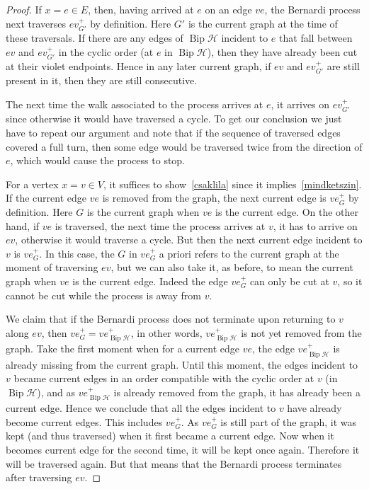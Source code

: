 \documentclass[10pt]{amsart}
\theoremstyle{definition}\newtheorem{defi}[theo]{Definition}
\theoremstyle{remark}\newtheorem{rema}[theo]{Remark}
\newcommand{\HH}{\mathcal H}
\DeclareMathOperator{\bip}{Bip}
\begin{document}
\begin{proof}
If $x=e\in E$, then, having arrived at $e$ on an edge $ve$, the Bernardi process next traverses $ev_{G'}^+$ by definition. Here $G'$ is the current graph at the time of these traversals. If there are any edges of $\bip\HH$ incident to $e$ that fall between $ev$ and $ev_{G'}^+$ in the cyclic order (at $e$ in $\bip\HH$), then they have already been cut at their violet endpoints. Hence in any later current graph, if $ev$ and $ev_{G'}^+$ are still present in it, then they are still consecutive.

The next time the walk associated to the process arrives at $e$, it arrives on $ev^+_{G'}$ since otherwise it would have traversed a cycle. To get our conclusion we just have to repeat our argument and note that if the sequence of traversed edges covered a full turn, then some edge would be traversed twice from the direction of $e$, which would cause the process to stop.

For a vertex $x=v\in V$, it suffices to show~\ref{csaklila} since it implies~\ref{mindketszin}. If the current edge $ve$ is removed from the graph, the next current edge is $ve_G^+$ by definition. Here $G$ is the current graph when $ve$ is the current edge. On the other hand, if $ve$ is traversed, the next time the process arrives at $v$, it has to arrive on $ev$, otherwise it would traverse a cycle. But then the next current edge incident to $v$ is $ve_G^+$. In this case, the $G$ in $ve_G^+$ a priori refers to the current graph at the moment of traversing $ev$, but we can also take it, as before, to mean the current graph when $ve$ is the current edge. Indeed the edge $ve_G^+$ can only be cut at $v$, so it cannot be cut while the process is away from $v$.

We claim that if the Bernardi process does not terminate upon returning to $v$ along $ev$, then $ve_G^+=ve_{\bip \HH}^+$, in other words, $ve_{\bip \HH}^+$ is not yet removed from the graph. Take the first moment when for a current edge $ve$, the edge $ve_{\bip \HH}^+$ is already missing from the current graph. Until this moment, the edges incident to $v$ became current edges in an order compatible with the cyclic order at $v$ (in $\bip \HH$), and as $ve_{\bip \HH}^+$ is already removed from the graph, it has already been a current edge. Hence we conclude that all the edges incident to $v$ have already become current edges. This includes $ve_G^+$. As $ve_G^+$ is still part of the graph, it was kept (and thus traversed) when it first became a current edge. Now when it becomes current edge for the second time, it will be kept once again. Therefore it will be traversed again. But that means that the Bernardi process terminates after traversing $ev$.
\end{proof}
\end{document}

